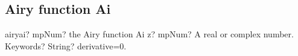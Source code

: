 %
%
%
%
%
%
%
%
%
%


\subsection{Airy function Ai}

\begin{mpFunctionsExtract}
	\mpFunctionTwo
	{airyai? mpNum? the Airy function Ai}
	{z? mpNum? A real or complex number.}
	{Keywords? String? derivative=0.}	
\end{mpFunctionsExtract}

